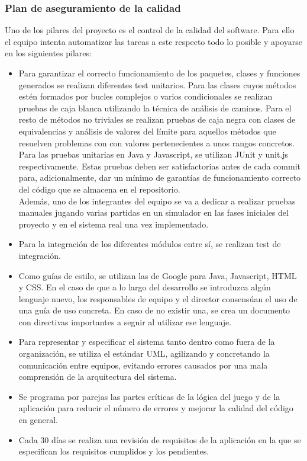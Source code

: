 \subsubsection{Plan de aseguramiento de la calidad}
Uno de los pilares del proyecto es el control de la calidad del software. Para ello el equipo intenta automatizar las tareas a este respecto todo lo posible y apoyarse en los siguientes pilares:
\begin{itemize}
\item{Para garantizar el correcto funcionamiento de los paquetes, clases y funciones generados se realizan diferentes test unitarios. Para las clases cuyos métodos estén formados por bucles complejos o varios condicionales se realizan pruebas de caja blanca utilizando la técnica de análisis de caminos. Para el resto de métodos no triviales se realizan pruebas de caja negra con clases de equivalencias y análisis de valores del límite para aquellos métodos que resuelven problemas con con valores pertenecientes a unos rangos concretos. Para las pruebas unitarias en Java y Javascript, se utilizan JUnit y unit.js respectivamente. Estas pruebas deben ser satisfactorias antes de cada commit para,  adicionalmente, dar un mínimo de garantías de funcionamiento correcto del código que se almacena en el repositorio.\\ Además, uno de los integrantes del equipo se va a dedicar a realizar pruebas manuales jugando varias partidas en un simulador en las fases iniciales del proyecto y en el sistema real una vez implementado.}
\item{Para la integración de los diferentes módulos entre sí, se realizan test de integración.}
\item{Como guías de estilo, se utilizan las de Google para Java, Javascript, HTML y CSS. En el caso de que a lo largo del desarrollo se introduzca algún lenguaje nuevo, los responsables de equipo y el director consensúan el uso de una guía de uso concreta. En caso de no existir una, se crea un documento con directivas importantes a seguir al utilizar ese lenguaje.}
\item{Para representar y especificar el sistema tanto dentro como fuera de la organización, se utiliza el estándar UML, agilizando y concretando la comunicación entre equipos, evitando errores causados por una mala comprensión de la arquitectura del sistema.}
\item{Se programa por parejas las partes críticas de la lógica del juego y de la aplicación para reducir el número de errores y mejorar la calidad del código en general.}
\item{Cada 30 días se realiza una revisión de requisitos de la aplicación en la que se especifican los requisitos cumplidos y los pendientes.}
\end{itemize}
